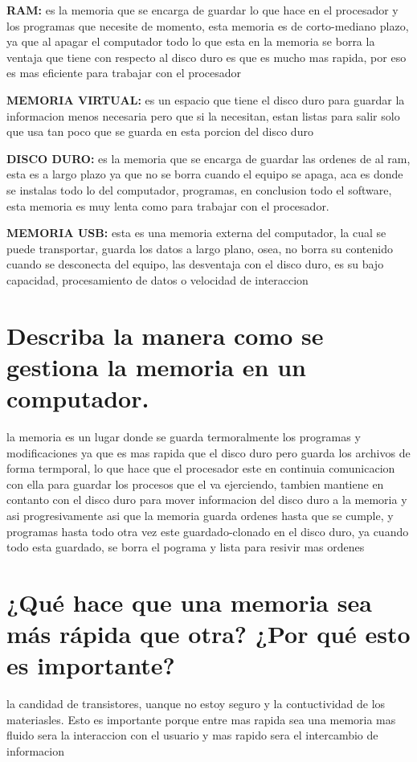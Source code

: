 \documentclass{article}
\begin{document}
\textbf{RAM:} es la memoria que se encarga de guardar lo que hace en el procesador y los programas que necesite de momento, esta memoria es de corto-mediano plazo, ya que al apagar el computador todo lo que  esta en la memoria se borra la ventaja que tiene con respecto al disco duro es que es mucho mas rapida, por eso es mas eficiente para trabajar con el procesador     

\textbf{MEMORIA VIRTUAL: } es un espacio que tiene el disco duro para guardar la informacion menos necesaria pero que si la necesitan, estan listas para salir solo que usa tan poco que se guarda en esta porcion del disco duro 

\textbf{DISCO DURO: } es la memoria que se encarga de guardar las ordenes de al ram, esta es a largo plazo ya que no se borra cuando el equipo se apaga, aca  es donde se instalas todo lo  del computador,  programas, en conclusion todo el software, esta memoria es muy lenta como para trabajar con el procesador. 

\textbf{MEMORIA USB: } esta es una memoria externa del computador, la cual se puede transportar, guarda los datos a largo plano, osea, no borra su contenido cuando se desconecta del equipo, las desventaja con el disco duro, es su bajo capacidad, procesamiento de datos o velocidad de interaccion  

\section{Describa la manera como se gestiona la memoria en un computador.}

la memoria es un lugar donde se guarda termoralmente los programas y modificaciones ya que es mas rapida que el disco duro pero guarda los archivos de forma termporal, lo que hace que el procesador este en continuia comunicacion con ella para guardar los procesos que el va ejerciendo, tambien mantiene en contanto con el disco duro para mover informacion del disco duro a la memoria y asi progresivamente asi que la memoria guarda ordenes hasta que se cumple, y programas hasta todo otra vez este guardado-clonado en el disco duro, ya cuando todo esta guardado, se borra el pograma y lista para resivir mas ordenes 

\section{¿Qué hace que una memoria sea más rápida que otra? ¿Por qué esto es importante?}

la candidad de transistores, uanque no estoy seguro y la contuctividad de los materiasles. Esto es importante porque entre mas rapida sea una memoria mas fluido sera la interaccion con el usuario y mas rapido sera el intercambio de informacion 
\end{document}
